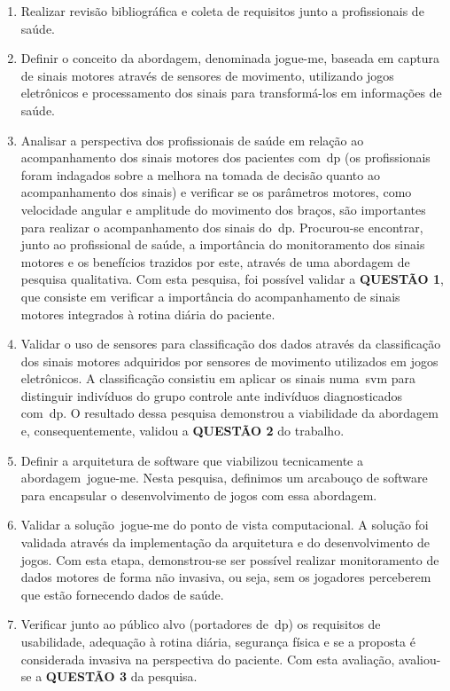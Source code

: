 \begin{enumerate}

\item{Realizar revisão bibliográfica e coleta de requisitos junto a profissionais de saúde.}

\item{Definir o conceito da abordagem, denominada \ac{jogue-me}, baseada em captura de sinais motores através de sensores de movimento, utilizando jogos eletrônicos e processamento dos sinais para transformá-los em informações de saúde.}


\item{Analisar a perspectiva dos profissionais de saúde em relação ao acompanhamento dos sinais motores dos pacientes com~\ac{dp} (os profissionais foram indagados sobre a melhora na tomada de decisão quanto ao acompanhamento dos sinais) e verificar se os parâmetros motores, como velocidade angular e amplitude do movimento dos braços, são importantes para realizar o acompanhamento dos sinais do~\ac{dp}. Procurou-se encontrar, junto ao profissional de saúde, a importância do monitoramento dos sinais motores e os benefícios trazidos por este, através de uma abordagem de pesquisa qualitativa. Com esta pesquisa, foi possível validar a \textbf{QUESTÃO 1}, que consiste em verificar a importância do acompanhamento de sinais motores integrados à rotina diária do paciente.}

\item{Validar o uso de sensores para classificação dos dados através da classificação dos sinais motores adquiridos por sensores de movimento utilizados em jogos eletrônicos. A classificação consistiu em aplicar os sinais numa~\ac{svm} para distinguir indivíduos do grupo controle ante indivíduos diagnosticados com~\ac{dp}.
O resultado dessa pesquisa demonstrou a viabilidade da abordagem e, consequentemente, validou a \textbf{QUESTÃO 2} do trabalho.}

\item{Definir a arquitetura de software que viabilizou tecnicamente a abordagem~\ac{jogue-me}. Nesta pesquisa, definimos um arcabouço de software para encapsular o desenvolvimento de jogos com essa abordagem.}

\item{Validar a solução~\ac{jogue-me} do ponto de vista computacional. A solução foi validada através da implementação da arquitetura e do desenvolvimento de jogos. Com esta etapa, demonstrou-se ser possível realizar monitoramento de dados motores de forma não invasiva, ou seja, sem os jogadores perceberem que estão fornecendo dados de saúde.}

\item{Verificar junto ao público alvo (portadores de~\ac{dp}) os requisitos de usabilidade, adequação à rotina diária, segurança física e se a proposta é considerada invasiva na perspectiva do paciente. Com esta avaliação, avaliou-se a \textbf{QUESTÃO 3} da pesquisa.}

\end{enumerate}

